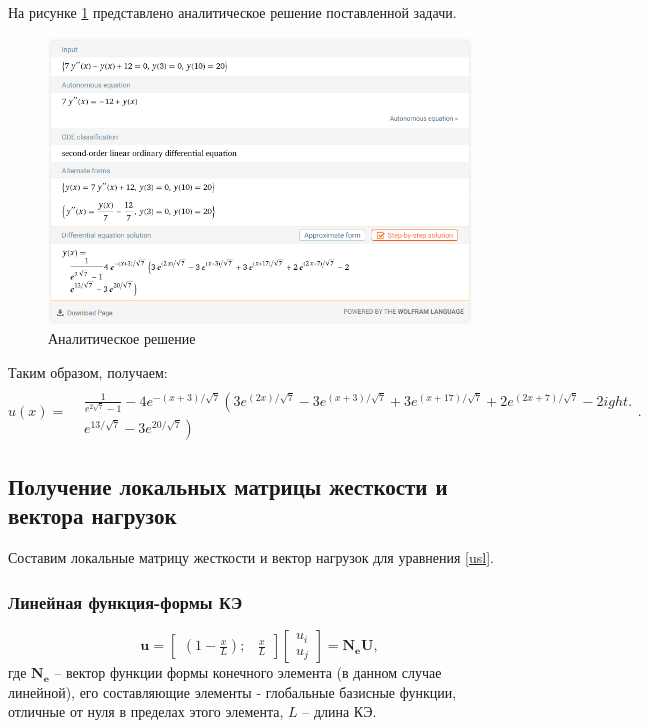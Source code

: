 На рисунке \ref{analit} представлено аналитическое решение поставленной задачи.
\begin{figure}[!h]
\begin{center}
\includegraphics[scale = 0.5]{labs/img/img1}
\end{center}
\caption{Аналитическое решение}
\label{analit}
\end{figure}

Таким образом, получаем:
$$
u(x)=\begin{align} \\ & \frac{1}{e^{2 \sqrt{7}}-1}-4 e^{-(x+3) / \sqrt{7}}\left(3 e^{(2 x) / \sqrt{7}}-3 e^{(x+3) / \sqrt{7}}+3 e^{(x+17) / \sqrt{7}}+2 e^{(2 x+7) / \sqrt{7}}-2
ight. \\ & \left.e^{13 / \sqrt{7}}-3 e^{20 / \sqrt{7}}\right) \end{align}.
$$


\subsection{Получение локальных матрицы жесткости и вектора нагрузок}

Составим локальные матрицу жесткости и вектор нагрузок для уравнения \ref{usl}.

\subsubsection{Линейная функция-формы КЭ}

$$
\mathbf{u}=\begin{bmatrix}
(1-\frac{x}{L}) ; & \frac{x}{L}
\end{bmatrix}
\begin{bmatrix}
u_i \\
u_j
\end{bmatrix}
=\mathbf{N_eU},
$$
где $\mathbf{N_e}$ -- вектор функции формы конечного элемента (в данном случае линейной), его составляющие элементы - глобальные базисные функции, отличные от нуля в пределах этого элемента, $L$ -- длина КЭ.

